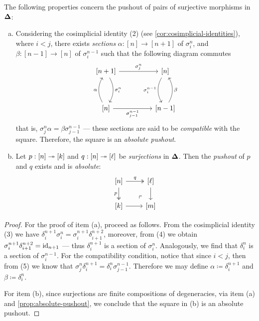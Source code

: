 \begin{lemma}
    \label{lem:splx-cat-pushout-surjections}
    The following properties concern the pushout of pairs of surjective morphisms in
    \({\mathbf{\Delta}}\):
    \begin{enumerate}[(a)]\setlength\itemsep{0em}
        \item Considering the cosimplicial identity (2) (see
              \cref{cor:cosimplicial-identities}), where \(i < j\), there exists
              \emph{sections} \(\alpha: [n] \to [n+1]\) of \(\sigma_i^n\), and
              \(\beta: [n-1] \to [n]\) of \(\sigma_i^{n-1}\) such that the following diagram
              commutes
              \[
                  \begin{tikzcd}
                      {[n+1]} \ar[rr, "\sigma_j^n"] \ar[dd, bend left, "\sigma_i^n"]
                      &&{[n]} \ar[dd, bend right, "\sigma_i^{n-1}"'] \\ & &\\
                      {[n]} \ar[uu, bend left, "\alpha"] \ar[rr, "\sigma_{j-1}^{n-1}"']
                      &&{[n-1]} \ar[uu, bend right, "\beta"']
                  \end{tikzcd}
              \]
              that is, \(\sigma_j^n \alpha = \beta \sigma_{j-1}^{n-1}\) --- these sections
              are said to be \emph{compatible} with the square. Therefore, the square is an
              \emph{absolute pushout}.
        \item Let \(p: [n] \twoheadrightarrow [k]\) and \(q: [n] \twoheadrightarrow [\ell]\) be \emph{surjections}
              in \({\mathbf{\Delta}}\). Then the \emph{pushout} of \(p\) and \(q\) exists and is
              \emph{absolute}:
              \[
                  \begin{tikzcd}
                      {[n]} \ar[r, two heads, "q"]
                      \ar[d, two heads, "p"']
                      \ar[rd, very near end, phantom, "\ulcorner"]
                      &{[\ell]} \ar[d] \\
                      {[k]} \ar[r] &{[m]}
                  \end{tikzcd}
              \]
    \end{enumerate}
\end{lemma}

\begin{proof}
    For the proof of item (a), proceed as follows. From the cosimplicial identity
    (3) we have \(\delta_i^{n+1} \sigma_i^n = \sigma_i^{n+1} \delta_{i+1}^{n+2}\),
    moreover, from (4) we obtain \(\sigma_i^{n+1} \delta_{i+1}^{n+2} = \operatorname{id}_{n+1}\)
    --- thus \(\delta_i^{n+1}\) is a section of \(\sigma_i^n\). Analogously, we find
    that \(\delta_i^n\) is a section of \(\sigma_i^{n-1}\). For the
    compatibility condition, notice that since \(i < j\), then from (5) we know that
    \(\sigma_j^n \delta_i^{n+1} = \delta_i^n \sigma_{j-1}^{n-1}\). Therefore we may
    define \(\alpha \coloneq \delta_i^{n+1}\) and \(\beta \coloneq \delta_i^n\).

    For item (b), since surjections are finite compositions of degeneracies, via
    item (a) and \cref{prop:absolute-pushout}, we conclude that the square in (b) is
    an absolute pushout.
\end{proof}

